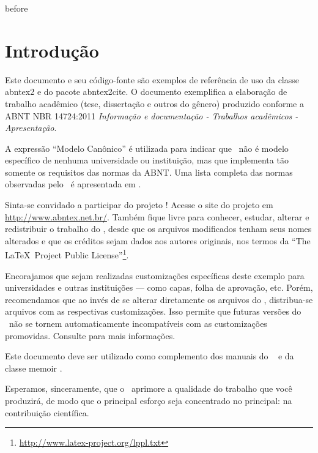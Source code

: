 \documentclass[
    12pt,
openright,             %
    twoside,               %
    a4paper,
french,            %
ngerman,           %
spanish,           %
brazil,            %
british,           %
    ]{abntex2}
\begin{document}
{before}
\textual  %

\chapter{Introdução}

Este documento e seu código-fonte são exemplos de referência de uso da classe
\textsf{abntex2} e do pacote \textsf{abntex2cite}. O documento
exemplifica a elaboração de trabalho acadêmico (tese, dissertação e outros do
gênero) produzido conforme a ABNT NBR 14724:2011 \emph{Informação e documentação
- Trabalhos acadêmicos - Apresentação}.

A expressão ``Modelo Canônico'' é utilizada para indicar que \abnTeX\ não é
modelo específico de nenhuma universidade ou instituição, mas que implementa tão
somente os requisitos das normas da ABNT. Uma lista completa das normas
observadas pelo \abnTeX\ é apresentada em .

Sinta-se convidado a participar do projeto \abnTeX! Acesse o site do projeto em
\url{http://www.abntex.net.br/}. Também fique livre para conhecer,
estudar, alterar e redistribuir o trabalho do \abnTeX, desde que os arquivos
modificados tenham seus nomes alterados e que os créditos sejam dados aos
autores originais, nos termos da ``The \LaTeX\ Project Public
License''\footnote{\url{http://www.latex-project.org/lppl.txt}}.

Encorajamos que sejam realizadas customizações específicas deste exemplo para
universidades e outras instituições --- como capas, folha de aprovação, etc.
Porém, recomendamos que ao invés de se alterar diretamente os arquivos do
\abnTeX, distribua-se arquivos com as respectivas customizações.
Isso permite que futuras versões do \abnTeX~não se tornem automaticamente
incompatíveis com as customizações promovidas. Consulte
 para mais informações.

Este documento deve ser utilizado como complemento dos manuais do \abnTeX\
\cite{abntex2classe,abntex2cite,abntex2cite-alf} e da classe \textsf{memoir}
\cite{memoir}.

Esperamos, sinceramente, que o \abnTeX\ aprimore a qualidade do trabalho que
você produzirá, de modo que o principal esforço seja concentrado no principal:
na contribuição científica.
\end{document}
